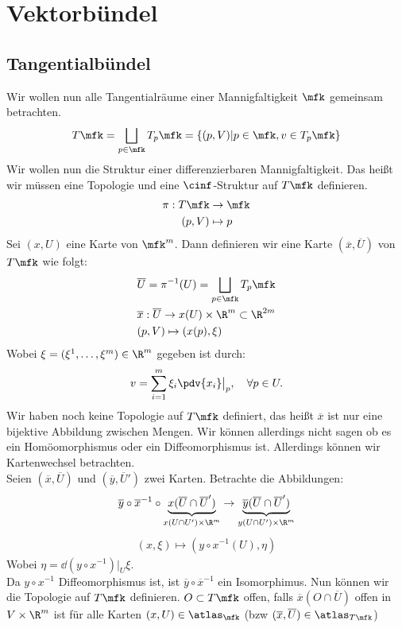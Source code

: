 \chapter{Vektorbündel}
\section{Tangentialbündel}
Wir wollen nun alle Tangentialräume einer Mannigfaltigkeit $\mfk$ gemeinsam betrachten.
\begin{align}
T\mfk = \bigsqcup_{p\in \mfk} T_{p}\mfk = \{ (p, V) \vert p \in \mfk, v \in T_{p}\mfk \} 
\end{align}
Wir wollen nun die Struktur einer differenzierbaren Mannigfaltigkeit. 
Das heißt wir müssen eine Topologie und eine $\cinf$-Struktur auf $T\mfk$ definieren.
\begin{align}
\pi: T\mfk &\to \mfk \\
(p,V) &\mapsto p
\end{align}
Sei $(x, U)$ eine Karte von $\mfk^m$. 
Dann definieren wir eine Karte $(\overline{x}, \overline{U})$ von $T\mfk$ wie folgt:
\begin{align}
&\overline{U} = \pi^{-1}(U) = \bigsqcup_{p\in\mfk} T_{p}\mfk \\
&\overline{x}: \overline{U} \to x(U) \times \R^m \subset \R^{2m} \\
&(p, V) \mapsto (x(p), \xi)
\end{align}
Wobei $\xi = (\xi^1, \dots, \xi^m) \in \R^m$ gegeben ist durch:
\begin{align}
v = \sum_{i=1}^{m} \xi_i \pdv{x_i} \big\vert_p, \quad \forall p \in U.
\end{align}
Wir haben noch keine Topologie auf $T\mfk$ definiert, das heißt $\overline{x}$ ist nur eine bijektive Abbildung zwischen Mengen.
Wir können allerdings nicht sagen ob es ein Homöomorphismus oder ein Diffeomorphismus ist.
Allerdings können wir Kartenwechsel betrachten.\\
Seien $(\overline{x}, \overline{U})$ und $(\overline{y}, \overline{U}')$ zwei Karten. 
Betrachte die Abbildungen:
\begin{align}
\overline{y} \circ \overline{x}^{-1} \circ \underbrace{x (\overline{U} \cap \overline{U}')}_{x(U \cap U') \times \R^m} \to \underbrace{\overline{y}(\overline{U} \cap \overline{U}')}_{y(U \cap U') \times \R^m}
\end{align}
\begin{align}
(x,\xi) \mapsto (y\circ x^{-1}(U), \eta) 
\end{align}
Wobei $\eta = \dd (y \circ x^{-1})\big\vert_U \xi$.\\
Da $y\circ x^{-1}$ Diffeomorphismus ist, ist $\overline{y} \circ \overline{x}^{-1}$ ein Isomorphimus.
Nun können wir die Topologie auf $T\mfk$ definieren.
$O \subset T\mfk$ offen, falls $\overline{x}(O\cap \overline{U})$ offen in $V \times \R^m$ ist für alle Karten $(x, U) \in \atlas_\mfk$ (bzw $(\overline{x}, \overline{U}) \in \atlas_{T\mfk}$)

